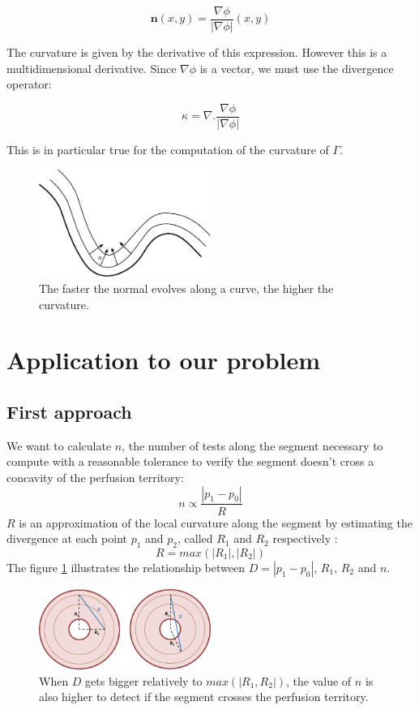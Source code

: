 \documentclass[11pt,a4paper]{article}
\begin{document}
	\begin{equation}
	\mathbf{n}(x,y) = \frac{\nabla \phi}{|\nabla \phi|}(x,y)
	\end{equation}
	
	The curvature is given by the derivative of this expression. However this is a multidimensional derivative. Since $\nabla \phi$ is a vector, we must use the divergence operator:
	
	\begin{equation}
	\kappa = \nabla . \frac{\nabla \phi}{|\nabla \phi|}
	\end{equation}
	
	This is in particular true for the computation of the curvature of $\Gamma$. 
	
		\begin{figure}
			\centering
			\includegraphics[width=0.5\textwidth]{Drawings/Distance.pdf}
			\caption{The faster the normal evolves along a curve, the higher the curvature.}
		\end{figure}
		
	\section{Application to our problem}
	\subsection{First approach}
We want to calculate $n$, the number of tests along the segment necessary to compute with a reasonable tolerance to verify the segment doesn't cross a concavity of the perfusion territory:
\begin{equation}
n \propto \frac{|p_1 - p_0|}{R}
\end{equation}
$R$ is an approximation of the local curvature along the segment by estimating the divergence at each point $p_1$ and $p_2$, called $R_1$ and $R_2$ respectively :
\begin{equation}
R = max(|R_1|, |R_2|)
\end{equation} 
The figure \ref{example} illustrates the relationship between $D = |p_1 - p_0|$, $R_1$, $R_2$ and $n$. 
\begin{figure}[h!]
\centering
\includegraphics[width=0.5\textwidth]{Drawings/CurvatureTestExample.png}
\caption{When $D$ gets bigger relatively to $max(|R_1, R_2|)$, the value of $n$ is also higher to detect if the segment crosses the perfusion territory.}
\label{example}
\end{figure}
\end{document}

